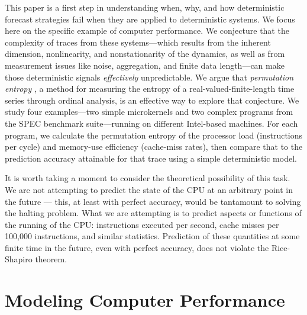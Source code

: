 \documentclass{article}
\begin{document}
This paper is a first step in understanding when, why, and how
deterministic forecast strategies fail when they are applied to
deterministic systems.  We focus here on the specific example of
computer performance.  We conjecture that the complexity of traces
from these systems---which results from the inherent dimension,
nonlinearity, and nonstationarity of the dynamics, as well as from
measurement issues like noise, aggregation, and finite data
length---can make those deterministic signals \emph{effectively}
unpredictable.  We argue that \emph{permutation entropy}
\cite{bandt2002per}, a method for measuring the entropy of a
real-valued-finite-length time series through ordinal analysis, is an
effective way to explore that conjecture.  We study four
examples---two simple microkernels and two complex programs from the
SPEC benchmark suite---running on different Intel-based machines.  For
each program, we calculate the permutation entropy of the processor
load (instructions per cycle) and memory-use efficiency (cache-miss
rates), then compare that to the prediction accuracy attainable for
that trace using a simple deterministic model.

It is worth taking a moment to consider the theoretical possibility of
this task. We are not attempting to predict the state of the CPU at an
arbitrary point in the future --- this, at least with perfect
accuracy, would be tantamount to solving the halting problem. What we
are attempting is to predict aspects or functions of the running of
the CPU: instructions executed per second, cache misses per 100,000
instructions, and similar statistics. Prediction of these quantities
at some finite time in the future, even with perfect accuracy, does
not violate the Rice-Shapiro theorem.


\section{Modeling Computer Performance}\label{sec:compModel}
\end{document}
